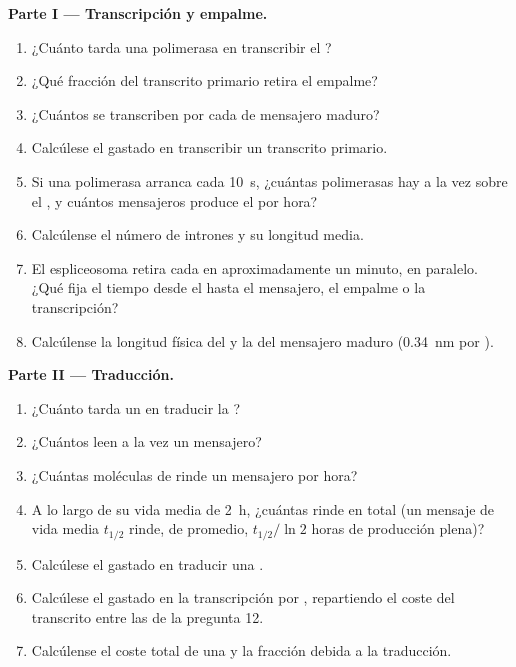 \begin{problem}
\medskip
\noindent\textbf{Parte I --- Transcripción y empalme.}
\begin{enumerate}
  \item ¿Cuánto tarda una polimerasa en transcribir el ?
  \item ¿Qué fracción del transcrito primario retira el empalme?
  \item ¿Cuántos  se transcriben por cada  de
        mensajero maduro?
  \item Calcúlese el  gastado en transcribir un transcrito primario.
  \item Si una polimerasa arranca cada \qty{10}{s}, ¿cuántas polimerasas
        hay a la vez sobre el , y cuántos mensajeros produce el  por
        hora?
  \item Calcúlense el número de intrones y su longitud media.
  \item El espliceosoma retira cada  en aproximadamente un minuto, en
        paralelo. ¿Qué fija el tiempo desde el  hasta el mensajero, el
        empalme o la transcripción?
  \item Calcúlense la longitud física del  y la del mensajero maduro
        (\qty{0.34}{nm} por ).
\end{enumerate}

\medskip
\noindent\textbf{Parte II --- Traducción.}
\begin{enumerate}[resume]
  \item ¿Cuánto tarda un  en traducir la ?
  \item ¿Cuántos  leen a la vez un mensajero?
  \item ¿Cuántas moléculas de  rinde un mensajero por hora?
  \item A lo largo de su vida media de \qty{2}{h}, ¿cuántas rinde en total
        (un mensaje de vida media $t_{1/2}$ rinde, de promedio,
        $t_{1/2}/\ln 2$ horas de producción plena)?
  \item Calcúlese el  gastado en traducir una .
  \item Calcúlese el  gastado en la transcripción por ,
        repartiendo el coste del transcrito entre las  de la
        pregunta 12.
  \item Calcúlense el coste total de una  y la fracción debida a la
        traducción.
\end{enumerate}


\end{problem}
